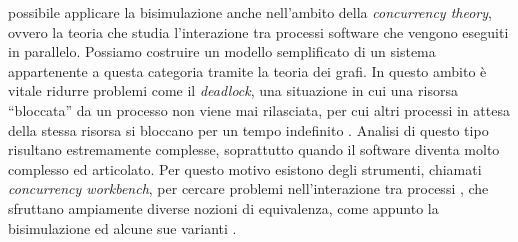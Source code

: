 \accente possibile applicare la bisimulazione anche nell'ambito della \emph{concurrency theory}, ovvero la teoria che studia l'interazione tra processi software che vengono eseguiti in parallelo. Possiamo costruire un modello semplificato di un sistema appartenente a questa categoria tramite la teoria dei grafi. In questo ambito è vitale ridurre problemi come il \emph{deadlock}, una situazione in cui una risorsa ``bloccata'' da un processo non viene mai rilasciata, per cui altri processi in attesa della stessa risorsa si bloccano per un tempo indefinito \cite{concurrency}. Analisi di questo tipo risultano estremamente complesse, soprattutto quando il software diventa molto complesso ed articolato. Per questo motivo esistono degli strumenti, chiamati \emph{concurrency workbench}, per cercare problemi nell'interazione tra processi \cite{caal}, che sfruttano ampiamente diverse nozioni di equivalenza, come appunto la bisimulazione ed alcune sue varianti \cite{kanellakis}.

